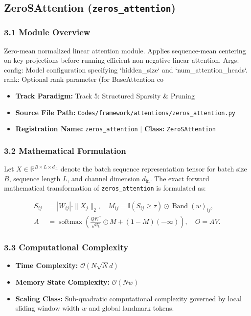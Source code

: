 \subsection{ZeroSAttention (\texttt{zeros\_attention})}
\label{sec:app_module_zeros_attention}

\subsubsection*{3.1 Module Overview}
Zero-mean normalized linear attention module.  Applies sequence-mean centering on key projections before running efficient non-negative linear attention.  Args:     config: Model configuration specifying `hidden\_size` and `num\_attention\_heads`.     rank: Optional rank parameter (for BaseAttention co
\begin{itemize}
    \item \textbf{Track Paradigm:} Track 5: Structured Sparsity & Pruning
    \item \textbf{Source File Path:} \texttt{Codes/framework/attentions/zeros\_attention.py}
    \item \textbf{Registration Name:} \texttt{zeros\_attention} $\mid$ \textbf{Class:} \texttt{ZeroSAttention}
\end{itemize}

\subsubsection*{3.2 Mathematical Formulation}
Let $X \in \mathbb{R}^{B \times L \times d_{\text{in}}}$ denote the batch sequence representation tensor for batch size $B$, sequence length $L$, and channel dimension $d_{\text{in}}$. The exact forward mathematical transformation of \texttt{zeros\_attention} is formulated as:

\begin{align}
S_{ij} &= |W_{ij}| \cdot \|X_j\|_2, \quad M_{ij} = \mathbb{I}(S_{ij} \ge \tau) \odot \operatorname{Band}(w)_{ij}, \\
A &= \operatorname{softmax}\left(\frac{Q K^\top}{\sqrt{d_k}} \odot M + (1 - M)(-\infty)\right), \quad O = A V.
\end{align}


\subsubsection*{3.3 Computational Complexity}
\begin{itemize}
    \item \textbf{Time Complexity:} $\mathcal{O}(N \sqrt{N} d)$
    \item \textbf{Memory State Complexity:} $\mathcal{O}(N w)$
    \item \textbf{Scaling Class:} Sub-quadratic computational complexity governed by local sliding window width $w$ and global landmark tokens.
\end{itemize}

